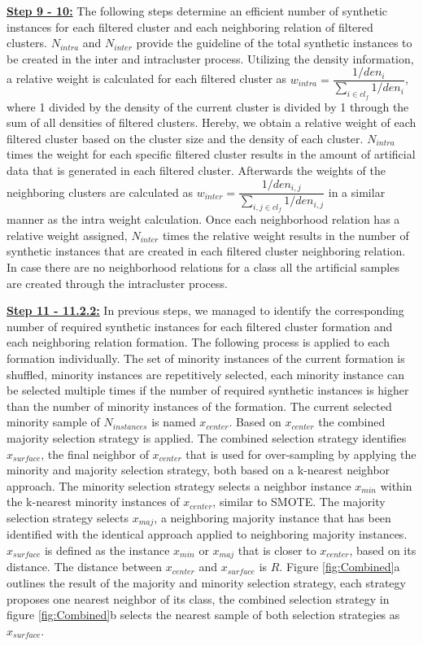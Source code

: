 \documentclass[parskip=full]{scrartcl}
\begin{document}
\textbf{\underline{Step 9 - 10:}} The following steps determine an efficient number of synthetic 
instances for each filtered cluster and each neighboring relation of filtered clusters. $N_{intra}$ and $N_{inter}$ 
provide the guideline of the total synthetic instances to be created in the inter and intracluster process.  
Utilizing the density information, a relative weight is calculated for each filtered cluster 
as $w_{intra} = \dfrac{1 / den_{i}}{\sum_{i \in cl_{f}} 1/den_{i}}$, where 1 divided by the density 
of the current cluster is divided by 1 through the sum of all densities of filtered clusters. 
Hereby, we obtain a relative weight of each filtered cluster based on the cluster size and the density 
of each cluster. $N_{intra}$ times the weight for each specific filtered cluster results in the amount of 
artificial data that is generated in each filtered cluster. Afterwards the weights of the neighboring 
clusters are calculated as $w_{inter} = \dfrac{1 / den_{i,j}}{\sum_{i,j \in cl_{f}} 1/den_{i,j}}$ in a 
similar manner as the intra weight calculation. Once each neighborhood relation has a relative weight 
assigned, $N_{inter}$ times the relative weight results in the number of synthetic instances that are 
created in each filtered cluster neighboring relation. In case there are no neighborhood relations for 
a class all the artificial samples are created through the intracluster process. 

\textbf{\underline{Step 11 - 11.2.2:}}  In previous steps, we managed to identify the corresponding 
number of required synthetic instances for each filtered cluster formation and each neighboring relation 
formation. The following process is applied to each formation individually. The set of minority instances 
of the current formation is shuffled, minority instances are repetitively selected, each minority 
instance can be selected multiple times if the number of required synthetic instances is higher than the 
number of minority instances of the formation. The current selected minority sample of $N_{instances}$ is 
named  $x_{center}$. Based on $x_{center}$ the combined majority selection strategy is applied. The combined 
selection strategy identifies $x_{surface}$, the final neighbor of $x_{center}$ that is used for over-sampling 
by applying the minority and majority selection strategy, both based on a k-nearest neighbor approach. The 
minority selection strategy selects a neighbor instance $x_{min}$ within the k-nearest minority instances of 
$x_{center}$, similar to SMOTE. The majority selection strategy selects $x_{maj}$, a neighboring majority 
instance that has been identified with the identical approach applied to neighboring majority instances. 
$x_{surface}$ is defined as the instance $x_{min}$ or $x_{maj}$ that is closer to $x_{center}$, based on 
its distance. The distance between $x_{center}$ and $x_{surface}$ is $R$. Figure \ref{fig:Combined}a 
outlines the result of the majority and minority selection strategy, each strategy proposes one nearest 
neighbor of its class, the combined selection strategy in figure \ref{fig:Combined}b selects the 
nearest sample of both selection strategies as $x_{surface}$.
\end{document}
